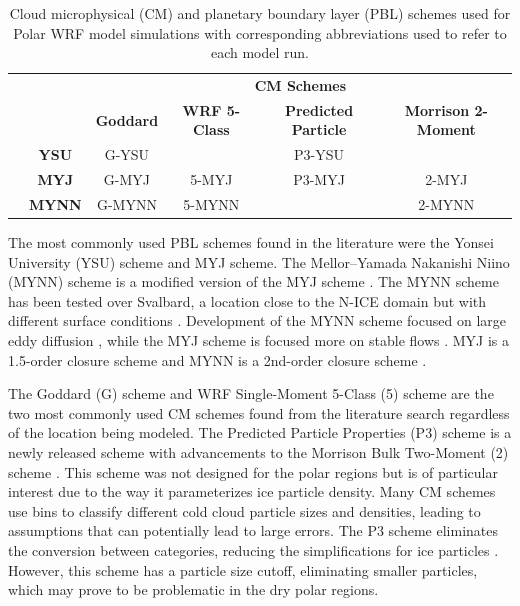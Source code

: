 \begin{table}[h]
\doublespacing
\centering
\footnotesize
{\begin{tabular}{| c | c | c | c | c | c |}
  \hline
 \rowcolor[HTML]{F3F3F3} & & \multicolumn{4}{c|}{\textbf{CM Schemes}} \\
 \rowcolor[HTML]{F3F3F3} & & \textbf{Goddard} & \textbf{WRF 5-Class} & \textbf{Predicted Particle} & \textbf{Morrison 2-Moment} \\
  \hline
\cellcolor[HTML]{F3F3F3}
 &\textbf{YSU} & G-YSU & & P3-YSU & \\
\cellcolor[HTML]{F3F3F3}  & \textbf{MYJ} & G-MYJ & 5-MYJ & P3-MYJ & 2-MYJ \\ 
\cellcolor[HTML]{F3F3F3}  \parbox[t]{3mm}{} \parbox[t]{2mm}{} & \textbf{MYNN} & G-MYNN & 5-MYNN & & 2-MYNN \\
  \hline
\end{tabular}}
\caption{Cloud microphysical (CM) and planetary boundary layer (PBL) schemes used for Polar WRF model simulations with corresponding abbreviations used to refer to each model run.}
\label{tab:schemes}
\end{table}

The most commonly used PBL schemes found in the literature were the Yonsei University (YSU) scheme \citep{hong:2004} and MYJ scheme. The Mellor–Yamada Nakanishi Niino (MYNN) scheme \citep{olson:2019} is a modified version of the MYJ scheme \citep{mesinger:1993}. The MYNN scheme has been tested over Svalbard, a location close to the N-ICE domain but with different surface conditions \citep{pilguj:2018}. Development of the MYNN scheme focused on large eddy diffusion \citep{cohen:2015}, while the MYJ scheme is focused more on stable flows \citep{janjic:1994, mellor:1982}. MYJ is a 1.5-order closure scheme and MYNN is a 2nd-order closure scheme \citep{pilguj:2018}.

The Goddard (G) scheme \citep{tao:2000} and WRF Single-Moment 5-Class (5) scheme \citep{hong:2004} are the two most commonly used CM schemes found from the literature search regardless of the location being modeled. The Predicted Particle Properties (P3) scheme is a newly released scheme with advancements to the Morrison Bulk Two-Moment (2) scheme \citep{milbrandt:2016, morrison:2015}. This scheme was not designed for the polar regions but is of particular interest due to the way it parameterizes ice particle density. Many CM schemes use bins to classify different cold cloud particle sizes and densities, leading to assumptions that can potentially lead to large errors. The P3 scheme eliminates the conversion between categories, reducing the simplifications for ice particles \citep{morrison:2005}. However, this scheme has a particle size cutoff, eliminating smaller particles, which may prove to be problematic in the dry polar regions.

